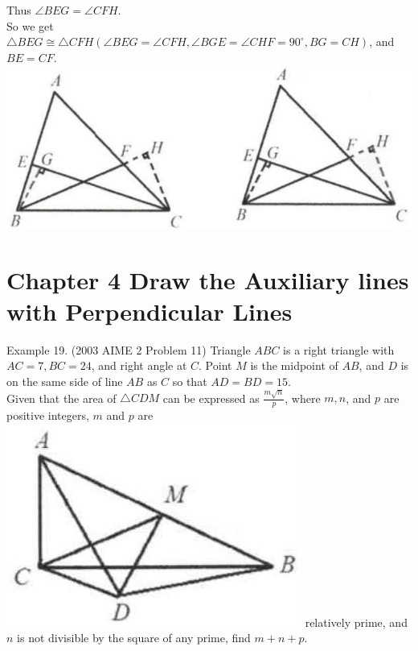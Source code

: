 \documentclass[10pt]{article}
\begin{document}
Thus \(\angle B E G=\angle C F H\).\\
So we get \(\triangle B E G \cong \triangle C F H\left(\angle B E G=\angle C F H, \angle B G E=\angle C H F=90^{\circ}, B G=C H\right)\), and \(B E=C F\).\\
\includegraphics[max width=\textwidth, center]{2025_04_17_97bc1f7e44d93c271a88g-085}

\section*{Chapter 4 Draw the Auxiliary lines with Perpendicular Lines}
Example 19. (2003 AIME 2 Problem 11) Triangle \(A B C\) is a right triangle with \(A C=7, B C=24\), and right angle at \(C\). Point \(M\) is the midpoint of \(A B\), and \(D\) is on the same side of line \(A B\) as \(C\) so that \(A D=B D=15\).\\
Given that the area of \(\triangle C D M\) can be expressed as \(\frac{m \sqrt{n}}{p}\), where \(m, n\), and \(p\) are positive integers, \(m\) and \(p\) are\\
\includegraphics[max width=\textwidth]{2025_04_17_97bc1f7e44d93c271a88g-086} relatively prime, and \(n\) is not divisible by the square of any prime, find \(m+n+p\).
\end{document}
